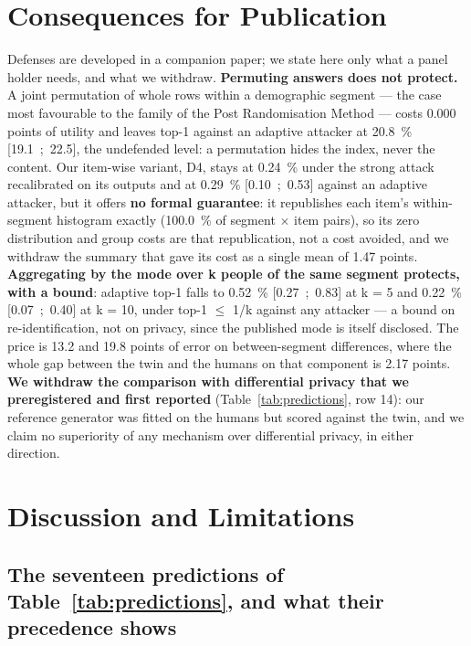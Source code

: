 \documentclass[sigconf,anonymous,review]{acmart}
\begin{document}
\section{Consequences for Publication}

Defenses are developed in a companion paper; we state here only what a panel holder needs, and what we withdraw. \textbf{Permuting answers does not protect.} A joint permutation of whole rows within a demographic segment --- the case most favourable to the family of the Post Randomisation Method \cite{gouweleeuw1998pram} --- costs 0.000 points of utility and leaves top-1 against an adaptive attacker at 20.8~\% [19.1~;~22.5], the undefended level: a permutation hides the index, never the content. Our item-wise variant, D4, stays at 0.24~\% under the strong attack recalibrated on its outputs and at 0.29~\% [0.10~;~0.53] against an adaptive attacker, but it offers \textbf{no formal guarantee}: it republishes each item's within-segment histogram exactly (100.0~\% of segment $\times$ item pairs), so its zero distribution and group costs are that republication, not a cost avoided, and we withdraw the summary that gave its cost as a single mean of 1.47 points. \textbf{Aggregating by the mode over k people of the same segment protects, with a bound}: adaptive top-1 falls to 0.52~\% [0.27~;~0.83] at k = 5 and 0.22~\% [0.07~;~0.40] at k = 10, under top-1 $\leq$ 1/k against any attacker --- a bound on re-identification, not on privacy, since the published mode is itself disclosed. The price is 13.2 and 19.8 points of error on between-segment differences, where the whole gap between the twin and the humans on that component is 2.17 points. \textbf{We withdraw the comparison with differential privacy that we preregistered and first reported} (Table~\ref{tab:predictions}, row 14): our reference generator was fitted on the humans but scored against the twin, and we claim no superiority of any mechanism over differential privacy, in either direction.

\section{Discussion and Limitations}

\subsection{The seventeen predictions of Table~\ref{tab:predictions}, and what their precedence shows}
\end{document}
